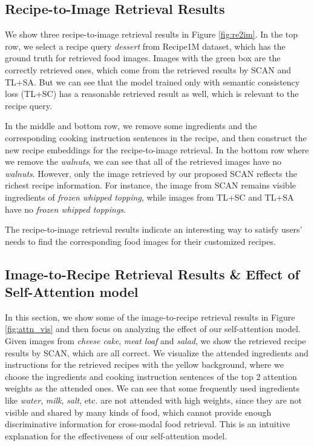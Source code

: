 \documentclass[journal]{IEEEtran}
\begin{document}
\subsection{Recipe-to-Image Retrieval Results}
We show three recipe-to-image retrieval results in Figure \ref{fig:re2im}. In the top row, we select a recipe query \emph{dessert} from Recipe1M dataset, which has the ground truth for retrieved food images. Images with the green box are the correctly retrieved ones, which come from the retrieved results by SCAN and TL+SA. But we can see that the model trained only with semantic consistency loss (TL+SC) has a reasonable retrieved result as well, which is relevant to the recipe query.

In the middle and bottom row, we remove some ingredients and the corresponding cooking instruction sentences in the recipe, and then construct the new recipe embeddings for the recipe-to-image retrieval. In the bottom row where we remove the \emph{walnuts}, we can see that all of the retrieved images have no \emph{walnuts}. However, only the image retrieved by our proposed SCAN reflects the richest recipe information. For instance, the image from SCAN remains visible ingredients of \emph{frozen whipped topping}, while images from TL+SC and TL+SA have no \emph{frozen whipped toppings}. 

The recipe-to-image retrieval results indicate an interesting way to satisfy users' needs to find the corresponding food images for their customized recipes.



\subsection{Image-to-Recipe Retrieval Results \& Effect of Self-Attention model}\label{attention_vis}
In this section, we show some of the image-to-recipe retrieval results in Figure \ref{fig:attn_vis} and then focus on analyzing the effect of our self-attention model. Given images from \emph{cheese cake}, \emph{meat loaf} and \emph{salad}, we show the retrieved recipe results by SCAN, which are all correct. We visualize the attended ingredients and instructions for the retrieved recipes with the yellow background, where we choose the ingredients and cooking instruction sentences of the top 2 attention weights as the attended ones. We can see that some frequently used ingredients like \emph{water}, \emph{milk}, \emph{salt}, etc. are not attended with high weights, since they are not visible and shared by many kinds of food, which cannot provide enough discriminative information for cross-modal food retrieval. This is an intuitive explanation for the effectiveness of our self-attention model. 
\end{document}

